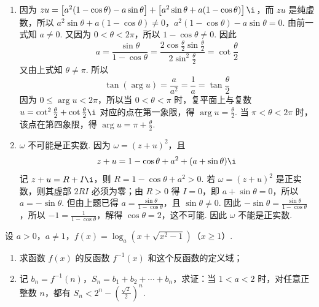 \begin{solution}
\begin{enumerate}
\item 因为 \(zu=\left[a^2(1-\cos\theta)-a\sin\theta\right]+\left[a^2\sin\theta+a(1-\cos\theta)\right]\i\)，而 \(zu\) 是纯虚数，所以 \(a^2\sin\theta+a(1-\cos\theta)\neq0\)，\(a^2(1-\cos\theta)-a\sin\theta=0\). 由前一式知 \(a\neq0\). 又因为 \(0<\theta<2\pi\)，所以 \(1-\cos\theta\neq0\). 因此
\[
a=\frac{\sin\theta}{1-\cos\theta}=\frac{2\cos\frac{\theta}{2}\sin\frac{\theta}{2}}{2\sin^2\frac{\theta}{2}}=\cot\frac{\theta}{2}
\]
又由上式知 \(\theta\neq\pi\). 所以
\[
\tan(\arg u)=\frac{a}{a^2}=\frac{1}{a}=\tan\frac{\theta}{2}
\]
因为 \(0\leqslant\arg u<2\pi\)，所以当 \(0<\theta<\pi\) 时，复平面上与复数 \(u=\cot^2\frac{\theta}{2}+\cot\frac{\theta}{2}\i\) 对应的点在第一象限，得 \(\arg u=\frac{\theta}{2}\). 当 \(\pi<\theta<2\pi\) 时，该点在第四象限，得 \(\arg u=\pi+\frac{\theta}{2}\).

\item \(\omega\) 不可能是正实数. 因为 \(\omega=(z+u)^2\)，且
\[
z+u=1-\cos\theta+a^2+(a+\sin\theta)\i
\]
记 \(z+u=R+I\i\)，则 \(R=1-\cos\theta+a^2>0\). 若 \(\omega=(z+u)^2\) 是正实数，则其虚部 \(2RI\) 必须为零；由 \(R>0\) 得 \(I=0\)，即 \(a+\sin\theta=0\)，所以 \(a=-\sin\theta\). 但由上题已得 \(a=\frac{\sin\theta}{1-\cos\theta}\)，且 \(\sin\theta\neq0\). 因此 \(-\sin\theta=\frac{\sin\theta}{1-\cos\theta}\)，所以 \(-1=\frac{1}{1-\cos\theta}\)，解得 \(\cos\theta=2\)，这不可能. 因此 \(\omega\) 不能是正实数.
\end{enumerate}
\end{solution}

\begin{problem}
设 \(a > 0\)，\(a \neq 1\)，\(f(x) = \log_a\left(x + \sqrt{x^2 - 1}\right)\)（\(x \geqslant 1\)）.
\begin{enumerate}
\item 求函数 \(f(x)\) 的反函数 \(f^{-1}(x)\) 和这个反函数的定义域；
\item 记 \(b_n = f^{-1}(n)\)，\(S_n = b_1 + b_2 + \cdots + b_n\)，求证：当 \(1 < a < 2\) 时，对任意正整数 \(n\)，都有 \(S_n < 2^n - \left(\frac{\sqrt{2}}{2}\right)^n\).
\end{enumerate}
\end{problem}

